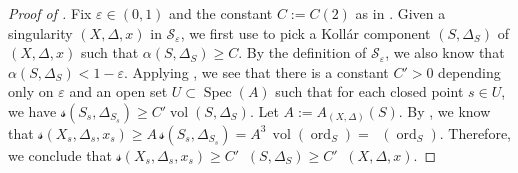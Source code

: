\documentclass[11pt,reqno]{amsart}
\DeclareMathOperator{\Spec}{Spec}
\DeclareMathOperator{\vol}{vol}
\DeclareMathOperator{\nvol}{\widehat{vol}}
\DeclareMathOperator{\ord}{ord}
\numberwithin{equation}{section}
\theoremstyle{definition}
\newcommand{\s}{\mathscr{s}}
\begin{document}
\begin{proof}[Proof of ]
    Fix $\varepsilon \in (0,1)$ and the constant $C := C(2) $ as in . Given a singularity $(X, \Delta, x)$ in $\mathscr{S}_{\varepsilon}$, we first use  to pick a Koll\'ar component $(S, \Delta_S)$ of $(X, \Delta, x)$ such that $\alpha(S, \Delta_S) \geq C$. By the definition of $\mathscr{S}_\varepsilon$, we also know that $\alpha(S, \Delta_S) < 1 - \varepsilon.$ Applying , we see that there is a constant $C' >0$ depending only on $\varepsilon $ and an open set $U \subset \Spec (A)$ such that for each closed point $s \in U$, we have $\mathscr{s}(S_s, \Delta_{S_s}) \geq C' \vol (S, \Delta_S)$. Let $A := A_{(X, \Delta)} (S) $. By , we know that $\s (X_s, \Delta_s, x_s) \geq A \, \s (S_s, \Delta_{S_s}) = A^3 \, \vol(\ord_S) = \nvol(\ord_S)$. Therefore, we conclude that $\s (X_s, \Delta_s, x_s) \geq C' \nvol(S, \Delta_S) \geq C' \nvol (X, \Delta, x)$.  
\end{proof}




\end{document}
